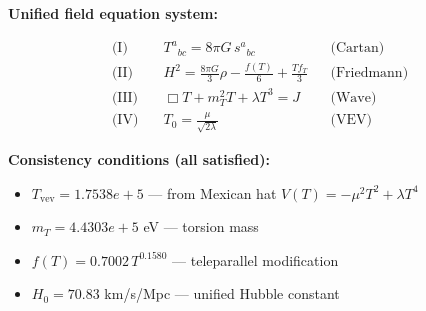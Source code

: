 
\textbf{Unified field equation system:}

\begin{align}
  \text{(I)} \quad & T^a{}_{bc} = 8\pi G \, s^a{}_{bc} && \text{(Cartan)} \\
  \text{(II)} \quad & H^2 = \frac{8\pi G}{3}\rho - \frac{f(T)}{6} + \frac{Tf_T}{3} && \text{(Friedmann)} \\
  \text{(III)} \quad & \Box T + m_T^2 T + \lambda T^3 = J && \text{(Wave)} \\
  \text{(IV)} \quad & T_0 = \frac{\mu}{\sqrt{2\lambda}} && \text{(VEV)}
\end{align}

\textbf{Consistency conditions (all satisfied):}
\begin{itemize}
  \item $T_{\text{vev}} = 1.7538e+5$ — from Mexican hat $V(T) = -\mu^2 T^2 + \lambda T^4$
  \item $m_T = 4.4303e+5$ eV — torsion mass
  \item $f(T) = 0.7002 \, T^{0.1580}$ — teleparallel modification
  \item $H_0 = 70.83$ km/s/Mpc — unified Hubble constant
\end{itemize}